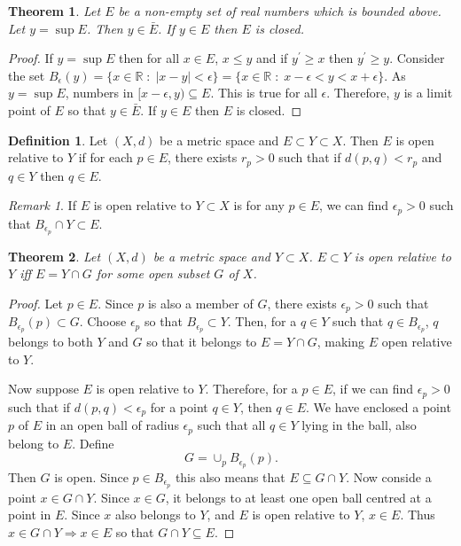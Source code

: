 \documentclass{article}
\theoremstyle{plain}
\newtheorem{thm}{Theorem}
\numberwithin{thm}{section}
\theoremstyle{plain}
\numberwithin{prop}{section}
\theoremstyle{definition}
\newtheorem{defn}{Definition}
\numberwithin{defn}{section}
\theoremstyle{remark}
\newtheorem*{rem}{Remark}
\numberwithin{equation}{section}
\newcommand{\op}{\prime}
\begin{document}
\begin{thm}\label{s1t8}
Let $E$ be a non-empty set of real numbers which is bounded above. Let $y = 
\sup{E}$. Then $y \in \bar{E}$. If $y \in E$ then $E$ is closed.
\end{thm}
\begin{proof}
If $y = \sup E$ then for all $x \in E$, $x \le y$ and if $y^\op \ge x$ then
$y^\op \ge y$. Consider the set $B_\epsilon(y) = \{x \in \mathbb{R}\;:\; |x - y|
< \epsilon\} = \{x \in \mathbb{R} \;:\; x - \epsilon < y < x + \epsilon\}$. As
$y = \sup E$, numbers in $[x - \epsilon, y) \subseteq E$. This is true for all
$\epsilon$. Therefore, $y$ is a limit point of $E$ so that $y \in \bar{E}$. If
$y \in E$ then $E$ is closed.
\end{proof}

\begin{defn}\label{s1d16}
Let $(X, d)$ be a metric space and $E \subset Y \subset X$. Then $E$ is open 
relative to $Y$ if for each $p \in E$, there exists $r_p > 0$ such that if
$d(p, q) < r_p$ and $q \in Y$ then $q \in E$.
\end{defn}
\begin{rem}
If $E$ is open relative to $Y \subset X$ is for any $p \in E$, we can find 
$\epsilon_p > 0$ such that $B_{\epsilon_p} \cap Y \subset E$.
\end{rem}

\begin{thm}\label{s1t9}
Let $(X, d)$ be a metric space and $Y \subset X$. $E \subset Y$ is open relative
to $Y$ iff $E = Y \cap G$ for some open subset $G$ of $X$.
\end{thm}
\begin{proof}
Let $p \in E$. Since $p$ is also a member of $G$, there exists $\epsilon_p > 0$
such that $B_{\epsilon_p}(p) \subset G$. Choose $\epsilon_p$ so that 
$B_{\epsilon_p} \subset Y$. Then, for a $q \in Y$ such that $q \in 
B_{\epsilon_p}$, $q$ belongs to both $Y$ and $G$ so that it belongs to $E = Y
\cap G$, making $E$ open relative to $Y$.

Now suppose $E$ is open relative to $Y$. Therefore, for a $p \in E$, if we can
find $\epsilon_p > 0$ such that if $d(p, q) < \epsilon_p$ for a point $q \in Y$,
then $q \in E$. We have enclosed a point $p$ of $E$ in an open ball of radius
$\epsilon_p$ such that all $q \in Y$ lying in the ball, also belong to $E$. 
Define
\[
G = \cup_p B_{\epsilon_p}(p).
\]
Then $G$ is open. Since $p \in B_{\epsilon_p}$ this also means that $E \subseteq
G \cap Y$. Now conside a point $x \in G \cap Y$. Since $x \in G$, it belongs to
at least one open ball centred at a point in $E$. Since $x$ also belongs to $Y$,
and $E$ is open relative to $Y$, $x \in E$. Thus $x \in G \cap Y \Rightarrow
x \in E$ so that $G \cap Y \subseteq E$.
\end{proof}
\end{document}

